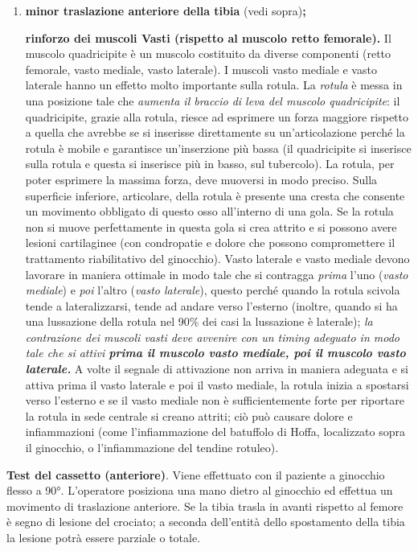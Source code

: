 \documentclass[]{article}
\begin{document}
\begin{enumerate}
\def\labelenumi{\arabic{enumi}.}
\item
  \textbf{minor traslazione anteriore della tibia} (vedi
  sopra)\textbf{;}

  \textbf{rinforzo dei muscoli Vasti (rispetto al muscolo retto
  femorale).} Il muscolo quadricipite è un muscolo costituito da diverse
  componenti (retto femorale, vasto mediale, vasto laterale). I muscoli
  vasto mediale e vasto laterale hanno un effetto molto importante sulla
  rotula. La \emph{rotula} è messa in una posizione tale che
  \emph{aumenta il braccio di leva del muscolo quadricipite}: il
  quadricipite, grazie alla rotula, riesce ad esprimere un forza
  maggiore rispetto a quella che avrebbe se si inserisse direttamente su
  un'articolazione perché la rotula è mobile e garantisce un'inserzione
  più bassa (il quadricipite si inserisce sulla rotula e questa si
  inserisce più in basso, sul tubercolo). La rotula, per poter esprimere
  la massima forza, deve muoversi in modo preciso. Sulla superficie
  inferiore, articolare, della rotula è presente una cresta che consente
  un movimento obbligato di questo osso all'interno di una gola. Se la
  rotula non si muove perfettamente in questa gola si crea attrito e si
  possono avere lesioni cartilaginee (con condropatie e dolore che
  possono compromettere il trattamento riabilitativo del ginocchio).
  Vasto laterale e vasto mediale devono lavorare in maniera ottimale in
  modo tale che si contragga \emph{prima} l'uno (\emph{vasto mediale}) e
  \emph{poi} l'altro (\emph{vasto laterale}), questo perché quando la
  rotula scivola tende a lateralizzarsi, tende ad andare verso l'esterno
  (inoltre, quando si ha una lussazione della rotula nel 90\% dei casi
  la lussazione è laterale); \emph{la contrazione dei muscoli vasti deve
  avvenire con un timing adeguato in modo tale che si attivi
  \textbf{prima il muscolo vasto mediale, poi il muscolo vasto
  laterale.}} A volte il segnale di attivazione non arriva in maniera
  adeguata e si attiva prima il vasto laterale e poi il vasto mediale,
  la rotula inizia a spostarsi verso l'esterno e se il vasto mediale non
  è sufficientemente forte per riportare la rotula in sede centrale si
  creano attriti; ciò può causare dolore e infiammazioni (come
  l'infiammazione del batuffolo di Hoffa, localizzato sopra il
  ginocchio, o l'infiammazione del tendine rotuleo).
\end{enumerate}

\textbf{Test del cassetto (anteriore)}. Viene effettuato con il paziente
a ginocchio flesso a 90°. L'operatore posiziona una mano dietro al
ginocchio ed effettua un movimento di traslazione anteriore. Se la tibia
trasla in avanti rispetto al femore è segno di lesione del crociato; a
seconda dell'entità dello spostamento della tibia la lesione potrà
essere parziale o totale.
\end{document}
